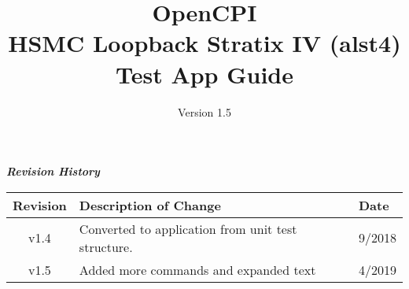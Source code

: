 \iffalse
This file is protected by Copyright. Please refer to the COPYRIGHT file
distributed with this source distribution.

This file is part of OpenCPI <http://www.opencpi.org>

OpenCPI is free software: you can redistribute it and/or modify it under the
terms of the GNU Lesser General Public License as published by the Free Software
Foundation, either version 3 of the License, or (at your option) any later
version.

OpenCPI is distributed in the hope that it will be useful, but WITHOUT ANY
WARRANTY; without even the implied warranty of MERCHANTABILITY or FITNESS FOR A
PARTICULAR PURPOSE. See the GNU Lesser General Public License for more details.

You should have received a copy of the GNU Lesser General Public License along
with this program. If not, see <http://www.gnu.org/licenses/>.
\fi

\def\docTitle{OpenCPI\\ HSMC Loopback Stratix IV (alst4) Test App Guide}
\def\docVersion{1.5}
\def\snippetpath{../../../../../doc/av/tex/snippets}


\date{Version \docVersion} %
\title{\docTitle}
\usepackage{graphicx}
\graphicspath{ {figures/} }
\usepackage{textcomp}
\usepackage{listings}



\maketitle
	\begin{center}
	\textit{\textbf{Revision History}}
		\begin{table}[H]
		\label{table:revisions} %
			\begin{tabularx}{\textwidth}{|c|X|l|}
			\hline
			\rowcolor{blue}
			\textbf{Revision} & \textbf{Description of Change} & \textbf{Date} \\
		    \hline
		    v1.4 & Converted to application from unit test structure. & 9/2018 \\
			\hline
			v1.5 & Added more commands and expanded text & 4/2019 \\
			\hline
			\end{tabularx}
		\end{table}
	\end{center}

